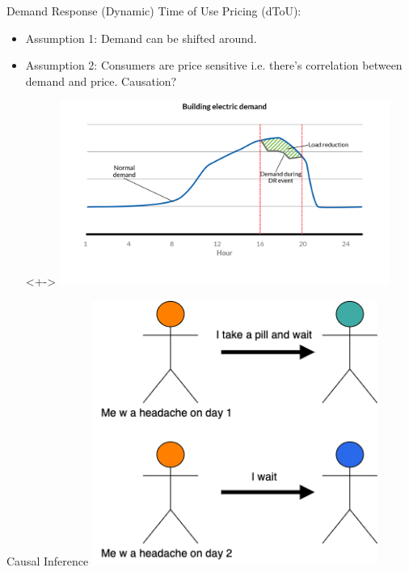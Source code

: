\documentclass{beamer}
\begin{document}
\begin{frame}{Demand Response}
  (Dynamic) Time of Use Pricing (dToU):
  \begin{itemize}
    \item<+-> Assumption 1: Demand can be shifted around.
    \item<+-> Assumption 2: Consumers are price sensitive i.e. there's correlation between demand and price. Causation?
    \item[]<+->
    \vspace{0.2cm}
    \centering
    \includegraphics[width=0.85\textwidth]{images/demand-response.png}
  \end{itemize}
\end{frame}

\begin{frame}{Causal Inference}
    \centering
    \includegraphics[width=0.7\textwidth]{images/headache-treatment-effect.png}
\end{frame}
\end{document}
